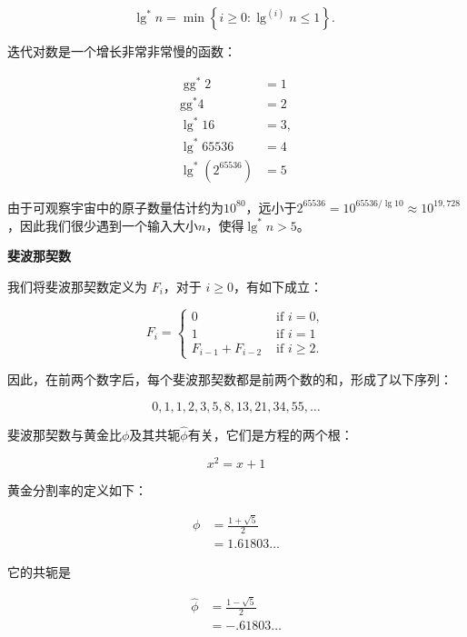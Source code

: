 \documentclass[lang=cn,newtx,10pt,scheme=chinese]{elegantbook}
\begin{document}
$$
\lg ^* n=\min \left\{i \geq 0: \lg ^{(i)} n \leq 1\right\} \text {. }
$$

迭代对数是一个增长非常非常慢的函数：

$$
\begin{aligned}
\operatorname{gg}^* 2 & =1 \\
\mathrm{gg}^* 4 & =2 \\
\lg ^* 16 & =3, \\
\lg ^* 65536 & =4 \\
\lg ^*\left(2^{65536}\right) & =5
\end{aligned}
$$

由于可观察宇宙中的原子数量估计约为$10^{80}$，远小于$2^{65536}=10^{65536 / \lg 10} \approx 10^{19,728}$，因此我们很少遇到一个输入大小$n$，使得$\lg ^* n>5$。

\textbf{斐波那契数}

我们将斐波那契数定义为 $F_i$，对于 $i \geq 0$，有如下成立：

\begin{equation}
F_i= \begin{cases}0 & \text { if } i=0, \\ 1 & \text { if } i=1 \\ F_{i-1}+F_{i-2} & \text { if } i \geq 2 .\end{cases}
\end{equation}

因此，在前两个数字后，每个斐波那契数都是前两个数的和，形成了以下序列：

$$
0,1,1,2,3,5,8,13,21,34,55,\ldots
$$

斐波那契数与黄金比$\phi$及其共轭$\hat{\phi}$有关，它们是方程的两个根：

$$
x^2=x+1
$$

黄金分割率的定义如下：

\begin{equation}
\begin{aligned}
\phi & =\frac{1+\sqrt{5}}{2} \\
& =1.61803 \ldots
\end{aligned}
\end{equation}

它的共轭是

\begin{equation}
\begin{aligned}
\widehat{\phi} & =\frac{1-\sqrt{5}}{2} \\
& =-.61803 \ldots
\end{aligned}
\end{equation}
\end{document}
